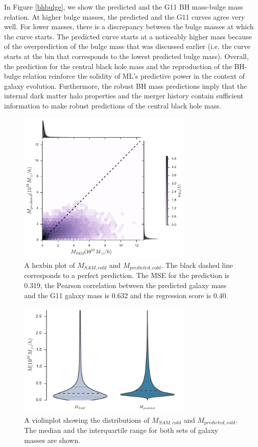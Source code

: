\documentclass[a4paper,fleqn,usenatbib]{mnras}
\begin{document}
\par In Figure \ref{bhbulge}, we show the predicted and the G11 BH mass-bulge mass relation. At higher bulge masses, the predicted and the G11 curves agree very well. For lower masses, there is a discrepancy between the bulge masses at which the curve starts. The predicted curve starts at a noticeably higher mass because of the overprediction of the bulge mass that was discussed earlier (i.e. the curve starts at the bin that corresponds to the lowest predicted bulge mass). Overall, the prediction for the central black hole mass and the reproduction of the BH-bulge relation reinforce the solidity of ML's predictive power in the context of galaxy evolution. Furthermore, the robust BH mass predictions imply that the internal dark matter halo properties and the merger history contain sufficient information to make robust predictions of the central black hole mass. 

\begin{figure}
\includegraphics[width=84mm]{fig11.pdf}
\caption{A hexbin plot of $M_{SAM,cold}$ and $M_{predicted,cold}$. The black dashed line corresponds to a perfect prediction. The MSE for the prediction is 0.319, the Pearson correlation between the predicted galaxy mass and the G11 galaxy mass is 0.632 and the regression score is 0.40.}
\label{cold1}

\end{figure}


\begin{figure}
  \includegraphics[width=84mm]{fig12.pdf}
  \caption{A violinplot showing the distributions of  $M_{SAM,cold}$ and $M_{predicted,cold}$. The median and the interquartile range for both sets of galaxy masses are shown.}
    \label{cold2}

\end{figure}
\end{document}
